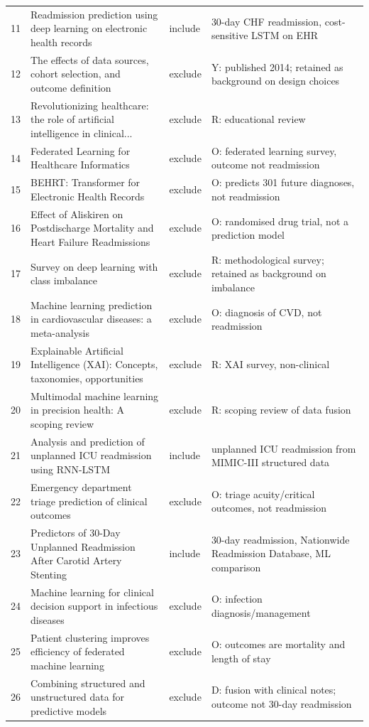 \begin{longtable}{rp{4.9cm}p{1.35cm}p{4.6cm}}
11 & Readmission prediction using deep learning on electronic health records & include & 30-day CHF readmission, cost-sensitive LSTM on EHR \\
12 & The effects of data sources, cohort selection, and outcome definition & exclude & Y: published 2014; retained as background on design choices \\
13 & Revolutionizing healthcare: the role of artificial intelligence in clinical... & exclude & R: educational review \\
14 & Federated Learning for Healthcare Informatics & exclude & O: federated learning survey, outcome not readmission \\
15 & BEHRT: Transformer for Electronic Health Records & exclude & O: predicts 301 future diagnoses, not readmission \\
16 & Effect of Aliskiren on Postdischarge Mortality and Heart Failure Readmissions & exclude & O: randomised drug trial, not a prediction model \\
17 & Survey on deep learning with class imbalance & exclude & R: methodological survey; retained as background on imbalance \\
18 & Machine learning prediction in cardiovascular diseases: a meta-analysis & exclude & O: diagnosis of CVD, not readmission \\
19 & Explainable Artificial Intelligence (XAI): Concepts, taxonomies, opportunities & exclude & R: XAI survey, non-clinical \\
20 & Multimodal machine learning in precision health: A scoping review & exclude & R: scoping review of data fusion \\
21 & Analysis and prediction of unplanned ICU readmission using RNN-LSTM & include & unplanned ICU readmission from MIMIC-III structured data \\
22 & Emergency department triage prediction of clinical outcomes & exclude & O: triage acuity/critical outcomes, not readmission \\
23 & Predictors of 30-Day Unplanned Readmission After Carotid Artery Stenting & include & 30-day readmission, Nationwide Readmission Database, ML comparison \\
24 & Machine learning for clinical decision support in infectious diseases & exclude & O: infection diagnosis/management \\
25 & Patient clustering improves efficiency of federated machine learning & exclude & O: outcomes are mortality and length of stay \\
26 & Combining structured and unstructured data for predictive models & exclude & D: fusion with clinical notes; outcome not 30-day readmission \\

\end{longtable}
